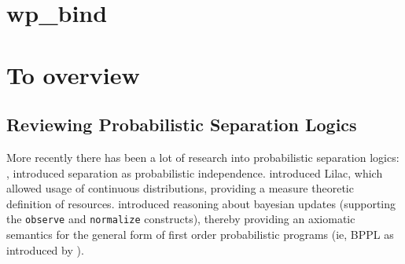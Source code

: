 





\section{wp\_bind}
\label{sec:wp-bind}



\section{To overview}
\subsection{Reviewing Probabilistic Separation Logics}
More recently there has been a lot of research into probabilistic separation logics: \citep{og_psl}, introduced separation as probabilistic independence.
\citep{lilac} introduced Lilac, which allowed usage of continuous distributions, providing a measure theoretic definition of resources. \citep{basl} introduced reasoning about bayesian
updates (supporting the \texttt{observe} and \texttt{normalize} constructs), thereby providing an axiomatic semantics for the general form of first order
probabilistic programs (ie, BPPL as introduced by \citep{prob-semantics}).

